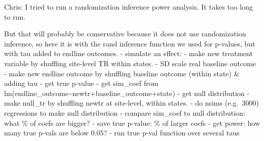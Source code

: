 \documentclass[
]{article}
\begin{document}
Chris: I tried to run a randomization inference power analysis. It takes
too long to run.

But that will probably be conservative because it does not use
randomization inference, so here it is with the rand inference function
we used for p-values, but with tau added to endline outcomes. - simulate
an effect: - make new treatment variable by shuffling site-level TR
within states. - SD scale real baseline outcome - make new endline
outcome by shuffling baseline outcome (within state) \& adding tau - get
true p-value - get sim\_coef from
lm(endline\_outcome\textasciitilde newtr+baseline\_outcome+state) - get
null distribution - make null\_tr by shuffling newtr at site-level,
within states. - do nsims (e.g.~3000) regressions to make null
distribution - compare sim\_coef to null distribution: what \% of coefs
are bigger? - save true p-value: \% of larger coefs - get power: how
many true p-vals are below 0.05? - run true p-val function over several
taus
\end{document}
